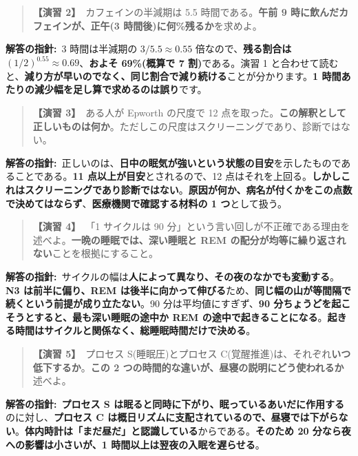 \documentclass{article}
\begin{document}
\begin{quote}
\textbf{【演習 2】}\ カフェインの半減期は 5.5 時間である。\textbf{午前 9 時に飲んだカフェインが、正午(3 時間後)に何\%残るか}を求めよ。
\end{quote}

\textbf{解答の指針:}\ 3 時間は半減期の \(3 / 5.5 \approx 0.55\) 倍なので、\textbf{残る割合は \((1/2)^{0.55} \approx 0.69\)}、\textbf{およそ 69\%(概算で 7 割)}である。演習 1 と合わせて読むと、\textbf{減り方が早いのでなく、同じ割合で減り続ける}ことが分かります。\textbf{1 時間あたりの減少幅を足し算で求めるのは誤り}です。

\begin{quote}
\textbf{【演習 3】}\ ある人が Epworth の尺度で 12 点を取った。\textbf{この解釈として正しいものは何か}。ただしこの尺度はスクリーニングであり、診断ではない。
\end{quote}

\textbf{解答の指針:}\ 正しいのは、\textbf{日中の眠気が強いという状態の目安}を示したものであることである。\textbf{11 点以上が目安}とされるので、12 点はそれを上回る。\textbf{しかしこれはスクリーニングであり診断ではない}。\textbf{原因が何か、病名が付くかをこの点数で決めてはならず}、\textbf{医療機関で確認する材料の 1 つ}として扱う。

\begin{quote}
\textbf{【演習 4】}\ 「1 サイクルは 90 分」という言い回しが不正確である理由を述べよ。\textbf{一晩の睡眠では、深い睡眠と REM の配分が均等に繰り返されない}ことを根拠にすること。
\end{quote}

\textbf{解答の指針:}\ サイクルの幅は\textbf{人によって異なり、その夜のなかでも変動する}。\textbf{N3 は前半に偏り、REM は後半に向かって伸びる}ため、\textbf{同じ幅の山が等間隔で続くという前提が成り立たない}。90 分は平均値にすぎず、\textbf{90 分ちょうどを起こそうとすると、最も深い睡眠の途中か REM の途中で起きることになる}。\textbf{起きる時間はサイクルと関係なく、総睡眠時間だけで決める}。

\begin{quote}
\textbf{【演習 5】}\ プロセス S(睡眠圧)とプロセス C(覚醒推進)は、それぞれ\textbf{いつ低下するか}。\textbf{この 2 つの時間的な違いが、昼寝の説明にどう使われるか}述べよ。
\end{quote}

\textbf{解答の指針:}\ \textbf{プロセス S は眠ると同時に下がり、眠っているあいだに作用する}のに対し、\textbf{プロセス C は概日リズムに支配されているので、昼寝では下がらない}。\textbf{体内時計は「まだ昼だ」と認識している}からである。\textbf{そのため 20 分なら夜への影響は小さいが、1 時間以上は翌夜の入眠を遅らせる}。
\end{document}
